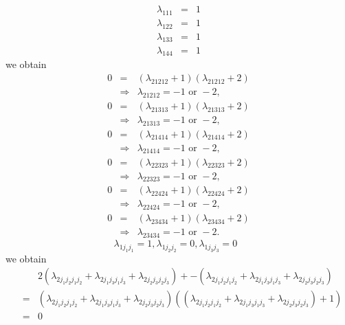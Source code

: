 \documentclass[12pt]{article}
\begin{document}
\begin{eqnarray*}
\lambda _{111} &=&1 \\
\lambda _{122} &=&1 \\
\lambda _{133} &=&1 \\
\lambda _{144} &=&1
\end{eqnarray*}%
we obtain 
\begin{eqnarray*}
0 &=&\left( \lambda _{21212}+1\right) \left( \lambda _{21212}+2\right) \\
&\Rightarrow &\lambda _{21212}=-1\text{ or }-2,
\end{eqnarray*}%
\begin{eqnarray*}
0 &=&\left( \lambda _{21313}+1\right) \left( \lambda _{21313}+2\right) \\
&\Rightarrow &\lambda _{21313}=-1\text{ or }-2,
\end{eqnarray*}%
\begin{eqnarray*}
0 &=&\left( \lambda _{21414}+1\right) \left( \lambda _{21414}+2\right) \\
&\Rightarrow &\lambda _{21414}=-1\text{ or }-2,
\end{eqnarray*}%
\begin{eqnarray*}
0 &=&\left( \lambda _{22323}+1\right) \left( \lambda _{22323}+2\right) \\
&\Rightarrow &\lambda _{22323}=-1\text{ or }-2,
\end{eqnarray*}%
\begin{eqnarray*}
0 &=&\left( \lambda _{22424}+1\right) \left( \lambda _{22424}+2\right) \\
&\Rightarrow &\lambda _{22424}=-1\text{ or }-2,
\end{eqnarray*}%
\begin{eqnarray*}
0 &=&\left( \lambda _{23434}+1\right) \left( \lambda _{23434}+2\right) \\
&\Rightarrow &\lambda _{23434}=-1\text{ or }-2.
\end{eqnarray*}%
\begin{equation*}
\lambda _{1j_{1}j_{1}}=1,\lambda _{1j_{2}j_{2}}=0,\lambda _{1j_{3}j_{3}}=0%
\text{ }
\end{equation*}%
we obtain 
\begin{eqnarray*}
&&2\left( \lambda _{2j_{1}j_{2}j_{1}j_{2}}+\lambda
_{2j_{1}j_{3}j_{1}j_{3}}+\lambda _{2j_{2}j_{3}j_{2}j_{3}}\right) +-\left(
\lambda _{2j_{1}j_{2}j_{1}j_{2}}+\lambda _{2j_{1}j_{3}j_{1}j_{3}}+\lambda
_{2j_{2}j_{3}j_{2}j_{3}}\right) \\
&=&\left( \lambda _{2j_{1}j_{2}j_{1}j_{2}}+\lambda
_{2j_{1}j_{3}j_{1}j_{3}}+\lambda _{2j_{2}j_{3}j_{2}j_{3}}\right) \left(
\left( \lambda _{2j_{1}j_{2}j_{1}j_{2}}+\lambda
_{2j_{1}j_{3}j_{1}j_{3}}+\lambda _{2j_{2}j_{3}j_{2}j_{3}}\right) +1\right) \\
&=&0
\end{eqnarray*}%
\end{document}
